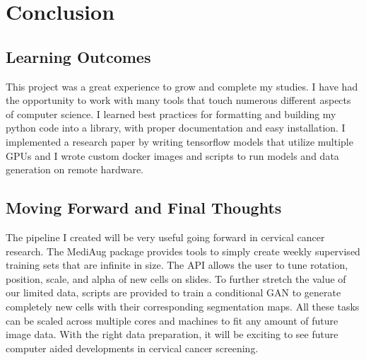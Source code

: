 \documentclass[ms,electronic,oneside,twosidetoc,letterpaper,chaptercenter,parttop]{byumsphd}
\begin{document}






\chapter{Conclusion}



\section{Learning Outcomes}

This project was a great experience to grow and complete my studies. I have had the opportunity to work with many tools that touch numerous different aspects of computer science. I learned best practices for formatting and building my python code into a library, with proper documentation and easy installation. I implemented a research paper by writing tensorflow models that utilize multiple GPUs and I wrote custom docker images and scripts to run models and data generation on remote hardware.

\section{Moving Forward and Final Thoughts}

The pipeline I created will be very useful going forward in cervical cancer research.
The MediAug package provides tools to simply create weekly supervised training sets that are
infinite in size. The API allows the user to tune rotation, position, scale, and alpha of new cells on slides. To further stretch the value of our limited data, scripts are provided to train a conditional GAN to generate completely new cells with their corresponding segmentation maps. All these tasks can be scaled across multiple cores and machines to fit any amount of future image data. With the right data preparation, it will be exciting to see future computer aided developments in cervical cancer screening.
\end{document}
